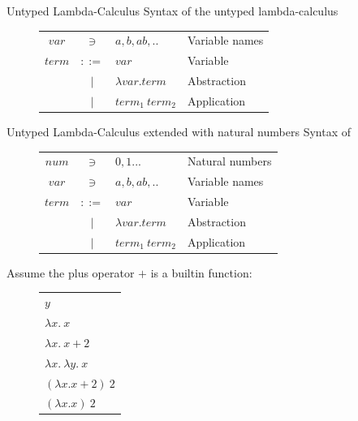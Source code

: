 \documentclass[pdf]{beamer}
\begin{document}
\begin{frame}{Untyped Lambda-Calculus}
Syntax of the untyped lambda-calculus
  \begin{figure}[H]
    \centering
    \begin{tabular}{c c l l}
      $var$  & $\ni$   & $a,b,ab,..$         & Variable names  \\
      $term$ & $::=$ & $var$               & Variable \\
             & $|$   & $\lambda var. term$       & Abstraction \\
             & $|$   & $term_1 \: term_{2}$ & Application \\
    \end{tabular}
  \end{figure}
\end{frame}

\begin{frame}{Untyped Lambda-Calculus extended with natural numbers}
  Syntax of
    \begin{figure}[H]
    \centering
    \begin{tabular}{c c l l}
      $num$  & $\ni$   & $0,1 ...$           & Natural numbers \\
      $var$  & $\ni$   & $a,b,ab,..$         & Variable names  \\
      $term$ & $::=$ & $var$               & Variable        \\
             & $|$   & $\lambda var. term$       & Abstraction    \\
             & $|$   & $term_1 \: term_{2}$ & Application     \\
    \end{tabular}
    \end{figure}

    Assume the plus operator $+$ is a builtin function:
    \begin{figure}
    \begin{tabular}{l}
      $y$ \\

      $\lambda x. \: x$ \\
      $\lambda x. \: x + 2$ \\
      $\lambda x. \: \lambda y. \: x$ \\

      $(\lambda x. x + 2) \: 2$ \\
      $(\lambda x. x) \: 2$ \\
    \end{tabular}
  \end{figure}
\end{frame}
\end{document}
